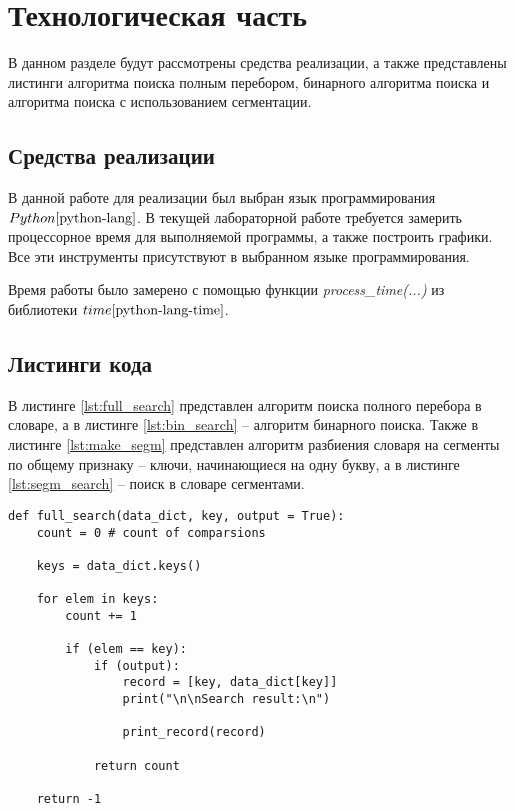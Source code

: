 \chapter{Технологическая часть}

В данном разделе будут рассмотрены средства реализации, а также представлены листинги алгоритма поиска полным перебором, бинарного алгоритма поиска и алгоритма поиска с использованием сегментации.

\section{Средства реализации}
В данной работе для реализации был выбран язык программирования $Python \cite{python-lang}$. В текущей лабораторной работе требуется замерить процессорное время для выполняемой программы, а также построить графики. Все эти инструменты присутствуют в выбранном языке программирования.

Время работы было замерено с помощью функции \textit{process\_time(...)} из библиотеки $time \cite{python-lang-time}$.


\section{Листинги кода}

В листинге \ref{lst:full_search} представлен алгоритм поиска полного перебора в словаре, а в листинге \ref{lst:bin_search} -- алгоритм бинарного поиска. Также в листинге \ref{lst:make_segm} представлен алгоритм разбиения словаря на сегменты по общему признаку -- 
ключи, начинающиеся на одну букву, а в листинге \ref{lst:segm_search} -- поиск в словаре сегментами.

\clearpage

\begin{center}
    \captionsetup{justification=raggedright,singlelinecheck=off}
    \begin{lstlisting}[label=lst:full_search,caption=Алгоритм поиска в словаре полным перебором]
def full_search(data_dict, key, output = True):
	count = 0 # count of comparsions

	keys = data_dict.keys()

	for elem in keys:
		count += 1

		if (elem == key):
			if (output):
				record = [key, data_dict[key]]
				print("\n\nSearch result:\n")
						
				print_record(record)
				
			return count

	return -1
\end{lstlisting}
\end{center}

